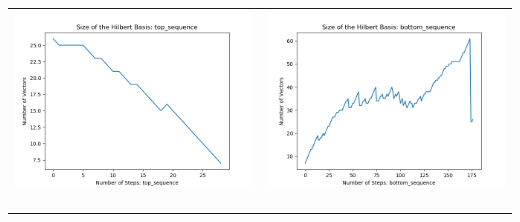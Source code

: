 \documentclass[10pt]{article}
\begin{document}
\begin{tabular}{c|c}
\begin{minipage}{.45\textwidth}
\includegraphics[width=\textwidth]{"DATA/5d/5 generators 2 bound C/top_sequence SIZE"}
\end{minipage} &
\begin{minipage}{.45\textwidth}
\includegraphics[width=\textwidth]{"DATA/5d/5 generators 2 bound C bottomup/bottom_sequence SIZE"}
\end{minipage} \\ \\
\hline \\\begin{minipage}{.45\textwidth}

\end{minipage}
\end{tabular}
\end{document}
